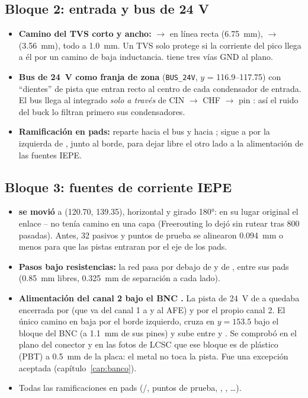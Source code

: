 \subsection{Bloque 2: entrada y bus de 24 V}

\begin{itemize}
  \item \textbf{Camino del TVS corto y ancho:}  $\to$  en línea recta (\SI{6.75}{\milli\meter}),
   $\to$  (\SI{3.56}{\milli\meter}), todo a \SI{1.0}{\milli\meter}. Un TVS solo protege si la corriente
  del pico llega a él por un camino de baja inductancia.  tiene tres vías GND al plano.
  \item \textbf{Bus de \SI{24}{\volt} como franja de zona} (\texttt{BUS\_24V}, $y$ = \numrange{116.9}{117.75}) con
  ``dientes'' de pista que entran recto al centro de cada condensador de entrada. El bus llega al integrado
  \emph{solo a través} de CIN $\to$ CHF $\to$ pin : así el ruido del buck lo filtran primero sus
  condensadores.
  \item \textbf{Ramificación en pads:}  reparte hacia el bus y hacia ;  sigue a
   por la izquierda de , junto al borde, para dejar libre el otro lado a la alimentación de las
  fuentes IEPE.
\end{itemize}

\subsection{Bloque 3: fuentes de corriente IEPE}

\begin{itemize}
  \item \textbf{ se movió} a (\num{120.70}, \num{139.35}), horizontal y girado \ang{180}: en su lugar
  original el enlace -- no tenía camino en una capa (Freerouting lo dejó sin rutear tras 800
  pasadas). Antes, 32 pasivos y puntos de prueba se alinearon \SI{0.094}{\milli\meter} o menos para que las pistas
  entraran por el eje de los pads.
  \item \textbf{Pasos bajo resistencias:} la red  pasa por debajo de  y de , entre sus pads
  (\SI{0.85}{\milli\meter} libres, \SI{0.325}{\milli\meter} de separación a cada lado).
  \item \textbf{Alimentación del canal 2 bajo el BNC .} La pista de \SI{24}{\volt} de  a 
  quedaba encerrada por  (que va del canal 1 a  y al AFE) y por el propio canal 2. El único camino en
   baja por el borde izquierdo, cruza en $y = \num{153.5}$ bajo el bloque del BNC  (a
  \SI{1.1}{\milli\meter} de sus pines) y sube entre  y . Se comprobó en el plano del conector y en las
  fotos de LCSC que ese bloque es de plástico (PBT) a \SI{0.5}{\milli\meter} de la placa: el metal no toca la pista.
  Fue una excepción aceptada (capítulo~\ref{cap:banco}).
  \item Todas las ramificaciones en pads (/, puntos de prueba, , ,
  \ldots).
\end{itemize}

